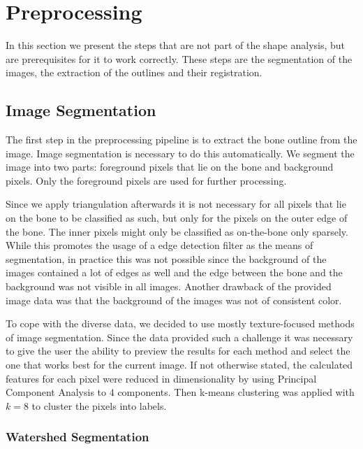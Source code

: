 \documentclass[pdftex,12pt,a4paper]{report}
\begin{document}
\section{Preprocessing}

In this section we present the steps that are not part of the shape analysis, but are prerequisites for it to work correctly. These steps are the segmentation of the images, the extraction of the outlines and their registration.

\subsection{Image Segmentation}
\label{sub:segmentation}

The first step in the preprocessing pipeline is to extract the bone outline from the image. Image segmentation
is necessary to do this automatically. We segment the image into two parts: foreground pixels that lie on the bone and background pixels. Only the foreground pixels are used for further processing.

Since we apply triangulation afterwards it is not necessary for all pixels that lie on the bone
to be classified as such, but only for the pixels on the outer edge of the bone. The inner pixels
might only be classified as on-the-bone only sparsely. While this promotes the usage of a edge detection
filter as the means of segmentation, in practice this was not possible since the background of the
images contained a lot of edges as well and the edge between the bone and the background was not
visible in all images. Another drawback of the provided image data was that the background of the images
was not of consistent color.

To cope with the diverse data, we decided to use mostly texture-focused methods of image segmentation. Since the data provided such a challenge it was necessary to give the user the ability to preview the results for each method and select the one that works best for the current image. If not otherwise stated, the calculated features for each pixel were reduced in dimensionality by using Principal Component Analysis to $4$ components. Then k-means clustering was applied with $k=8$ to cluster the pixels into labels.

\subsubsection{Watershed Segmentation}
\label{subsub:segmentationwatershed}
\end{document}
